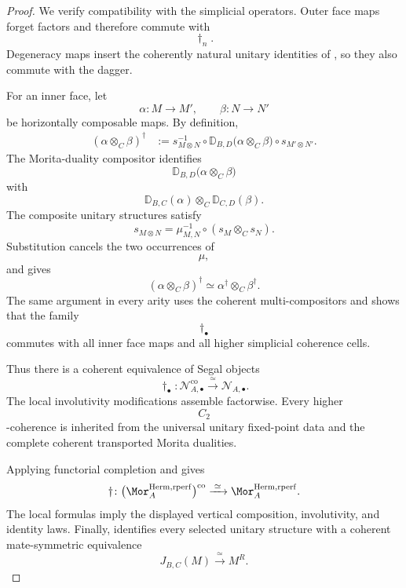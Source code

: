 \begin{proof}
We verify compatibility with the simplicial operators. Outer face maps
forget factors and therefore commute with
\[
    \dagger_n.
\]
Degeneracy maps insert the coherently natural unitary identities of
,
so they also commute with the dagger.

For an inner face, let
\[
    \alpha
    \colon
    M
    \longrightarrow
    M',
    \qquad
    \beta
    \colon
    N
    \longrightarrow
    N'
\]
be horizontally composable maps. By definition,
\[
\begin{aligned}
    (\alpha\otimes_C\beta)^\dagger
    &:=
    s_{M\otimes N}^{-1}
    \circ
    \mathbb D_{B,D}
    \bigl(
        \alpha\otimes_C\beta
    \bigr)
    \circ
    s_{M'\otimes N'}.
\end{aligned}
\]
The Morita-duality compositor identifies
\[
    \mathbb D_{B,D}
    \bigl(
        \alpha\otimes_C\beta
    \bigr)
\]
with
\[
    \mathbb D_{B,C}(\alpha)
    \otimes_C
    \mathbb D_{C,D}(\beta).
\]
The composite unitary structures satisfy
\[
    s_{M\otimes N}
    =
    \mu_{M,N}^{-1}
    \circ
    (s_M\otimes_Cs_N).
\]
Substitution cancels the two occurrences of
\[
    \mu,
\]
and gives
\[
    (\alpha\otimes_C\beta)^\dagger
    \simeq
    \alpha^\dagger
    \otimes_C
    \beta^\dagger.
\]
The same argument in every arity uses the coherent multi-compositors and
shows that the family
\[
    \dagger_\bullet
\]
commutes with all inner face maps and all higher simplicial coherence
cells.

Thus there is a coherent equivalence of Segal objects
\[
    \dagger_\bullet
    \colon
    \mathcal N_{A,\bullet}^{\mathrm{co}}
    \xrightarrow{\;\simeq\;}
    \mathcal N_{A,\bullet}.
\]
The local involutivity modifications assemble factorwise. Every higher
\[
    C_2
\]
-coherence is inherited from the universal unitary fixed-point data and
the complete coherent transported Morita dualities.

Applying functorial completion and
gives
\[
    \dagger
    \colon
    \bigl(
        \Mor_A^{\mathrm{Herm,rperf}}
    \bigr)^{\mathrm{co}}
    \xrightarrow{\;\simeq\;}
    \Mor_A^{\mathrm{Herm,rperf}}.
\]
The local formulas imply the displayed vertical composition,
involutivity, and identity laws. Finally,
identifies every selected unitary structure with a coherent
mate-symmetric equivalence
\[
    J_{B,C}(M)
    \xrightarrow{\;\simeq\;}
    M^R.
\]
\end{proof}

